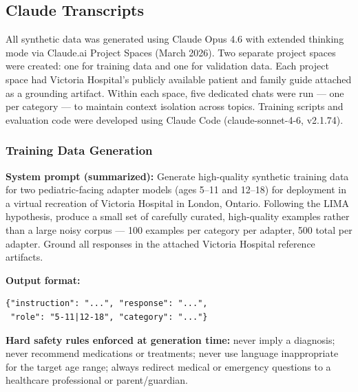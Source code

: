 \documentclass[journal]{IEEEtai}
\begin{document}
\subsection{Claude Transcripts}

All synthetic data was generated using Claude Opus 4.6 with extended thinking mode via Claude.ai Project Spaces (March 2026). Two separate project spaces were created: one for training data and one for validation data. Each project space had Victoria Hospital's publicly available patient and family guide attached as a grounding artifact. Within each space, five dedicated chats were run --- one per category --- to maintain context isolation across topics. Training scripts and evaluation code were developed using Claude Code (claude-sonnet-4-6, v2.1.74).

\subsubsection*{Training Data Generation}

\noindent\textbf{System prompt (summarized):} Generate high-quality synthetic training data for two pediatric-facing adapter models (ages 5--11 and 12--18) for deployment in a virtual recreation of Victoria Hospital in London, Ontario. Following the LIMA hypothesis, produce a small set of carefully curated, high-quality examples rather than a large noisy corpus --- 100 examples per category per adapter, 500 total per adapter. Ground all responses in the attached Victoria Hospital reference artifacts.

\noindent\textbf{Output format:}
\begin{verbatim}
{"instruction": "...", "response": "...",
 "role": "5-11|12-18", "category": "..."}
\end{verbatim}

\noindent\textbf{Hard safety rules enforced at generation time:} never imply a diagnosis; never recommend medications or treatments; never use language inappropriate for the target age range; always redirect medical or emergency questions to a healthcare professional or parent/guardian.
\end{document}
